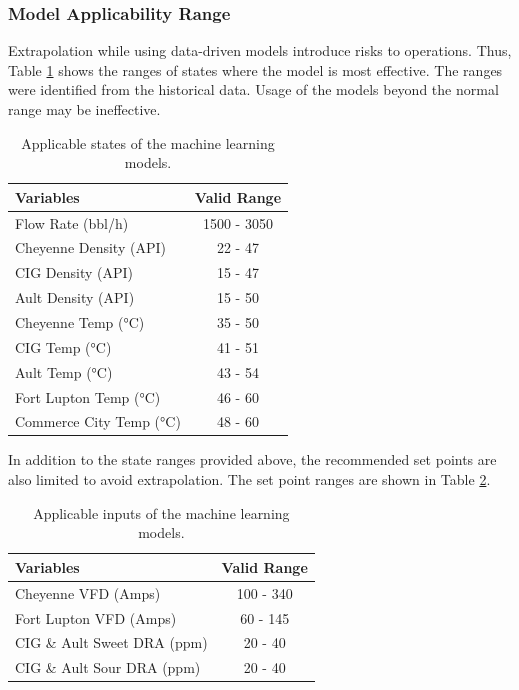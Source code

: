 \subsubsection{Model Applicability Range}
Extrapolation while using data-driven models introduce risks to operations. Thus, Table \ref{tab:08StateConst} shows the ranges of states where the model is most effective. The ranges were identified from the historical data. Usage of the models beyond the normal range may be ineffective.

\begin{table}[h]
    \centering
    {
    \begin{tabular}{ p{5cm} | c }
        Variables                         &  Valid Range           \\
        \hline
        Flow Rate (bbl/h)                       &      1500 - 3050       \\
        Cheyenne Density (API)                  &      22 - 47           \\ 
        CIG Density (API)                       &      15 - 47           \\
        Ault Density (API)                      &      15 - 50           \\
        Cheyenne Temp (°C)                      &      35 - 50           \\
        CIG Temp (°C)                           &      41 - 51           \\
        Ault Temp (°C)                          &      43 - 54           \\
        Fort Lupton Temp (°C)                   &      46 - 60           \\
        Commerce City Temp  (°C)                &      48 - 60           \\
    \end{tabular}}
    \caption{Applicable states of the machine learning models.}
    \label{tab:08StateConst}
\end{table}

In addition to the state ranges provided above, the recommended set points are also limited to avoid extrapolation.  The set point ranges are shown in Table \ref{tab:08InputConst}.

\begin{table}[h]
    \centering
    {
    \begin{tabular}{ p{6cm} | c }
        Variables                               &  Valid Range            \\
        \hline
        Cheyenne VFD (Amps)                     &      100 - 340          \\
        Fort Lupton VFD (Amps)                  &      60 - 145           \\ 
        CIG \& Ault Sweet DRA (ppm)             &      20 - 40            \\
        CIG \& Ault Sour DRA (ppm)              &      20 - 40            \\
    \end{tabular}}
    \caption{Applicable inputs of the machine learning models.}
    \label{tab:08InputConst}
\end{table}

